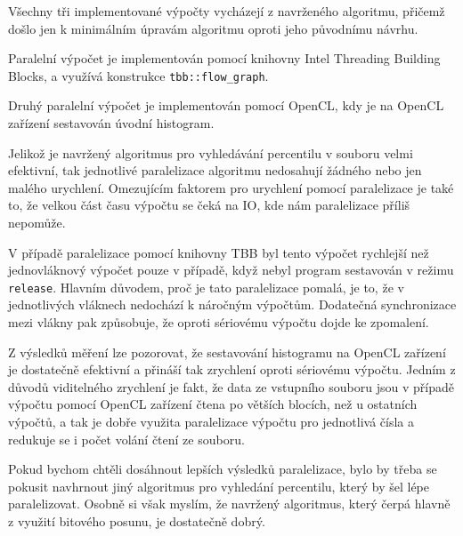 \documentclass[12pt, a4paper]{article}
\begin{document}
Všechny tři implementované výpočty vycházejí z navrženého algoritmu, přičemž došlo jen k minimálním úpravám algoritmu oproti jeho původnímu návrhu.

Paralelní výpočet je implementován pomocí knihovny Intel Threading Building Blocks, a využívá konstrukce \texttt{tbb::flow\_graph}.

Druhý paralelní výpočet je implementován pomocí OpenCL, kdy je na OpenCL zařízení sestavován úvodní histogram.

Jelikož je navržený algoritmus pro vyhledávání percentilu v souboru velmi efektivní, tak jednotlivé paralelizace algoritmu nedosahují žádného nebo jen malého urychlení. 
Omezujícím faktorem pro urychlení pomocí paralelizace je také to, že velkou část času výpočtu se čeká na IO, kde nám paralelizace příliš nepomůže.

V případě paralelizace pomocí knihovny TBB byl tento výpočet rychlejší než jednovláknový výpočet pouze v případě, když nebyl program sestavován v režimu \texttt{release}.
Hlavním důvodem, proč je tato paralelizace pomalá, je to, že v jednotlivých vláknech nedochází k náročným výpočtům.
Dodatečná synchronizace mezi vlákny pak způsobuje, že oproti sériovému výpočtu dojde ke zpomalení.

Z výsledků měření lze pozorovat, že sestavování histogramu na OpenCL zařízení je dostatečně efektivní a přináší tak zrychlení oproti sériovému výpočtu.
Jedním z důvodů viditelného zrychlení je fakt, že data ze vstupního souboru jsou v případě výpočtu pomocí OpenCL zařízení čtena po větších blocích, než u ostatních výpočtů, a tak je dobře využita paralelizace výpočtu pro jednotlivá čísla a redukuje se i počet volání čtení ze souboru.

Pokud bychom chtěli dosáhnout lepších výsledků paralelizace, bylo by třeba se pokusit navhrnout jiný algoritmus pro vyhledání percentilu, který by šel lépe paralelizovat.
Osobně si však myslím, že navržený algoritmus, který čerpá hlavně z využití bitového posunu, je dostatečně dobrý.
\end{document}

